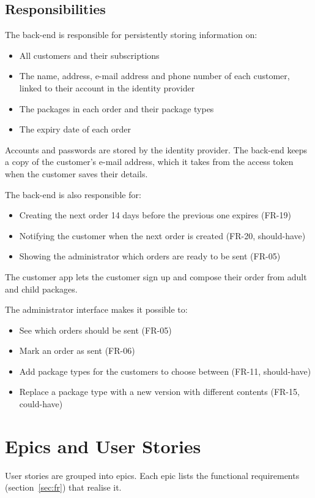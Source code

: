 \documentclass[a4paper,11pt]{article}
\begin{document}
\subsection{Responsibilities}
The back-end is responsible for persistently storing information on:
\begin{itemize}
    \item All customers and their subscriptions
    \item The name, address, e-mail address and phone number of each customer, linked to their account in the identity provider
    \item The packages in each order and their package types
    \item The expiry date of each order
\end{itemize}

Accounts and passwords are stored by the identity provider. The back-end keeps a copy of the customer's e-mail address, which it takes from the access token when the customer saves their details.

The back-end is also responsible for:
\begin{itemize}
    \item Creating the next order 14 days before the previous one expires (FR-19)
    \item Notifying the customer when the next order is created (FR-20, should-have)
    \item Showing the administrator which orders are ready to be sent (FR-05)
\end{itemize}

The customer app lets the customer sign up and compose their order from adult and child packages.

The administrator interface makes it possible to:
\begin{itemize}
    \item See which orders should be sent (FR-05)
    \item Mark an order as sent (FR-06)
    \item Add package types for the customers to choose between (FR-11, should-have)
    \item Replace a package type with a new version with different contents (FR-15, could-have)
\end{itemize}

\section{Epics and User Stories}
User stories are grouped into epics. Each epic lists the functional requirements (section~\ref{sec:fr}) that realise it.
\end{document}
